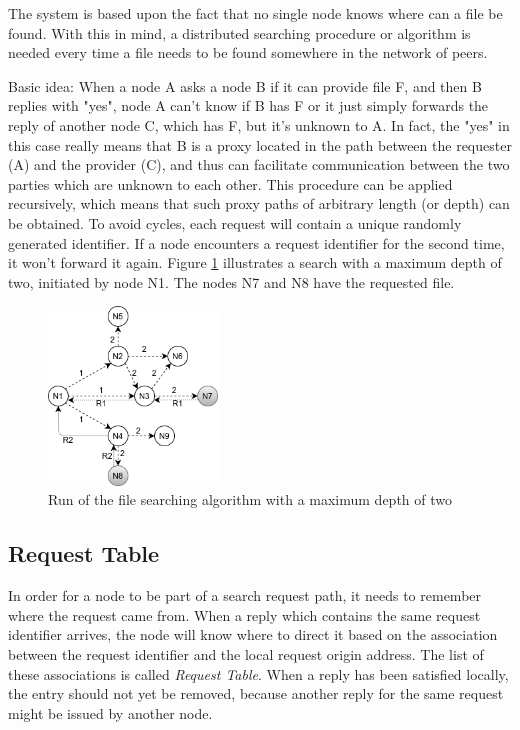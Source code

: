 The system is based upon the fact that no single node knows where can a file be 
found. With this in mind, a distributed searching procedure or algorithm is 
needed every time a file needs to be found somewhere in the network of peers.

Basic idea: When a node A asks a node B if it can provide file F, and then B 
replies with "yes", node A can't know if B has F or it just simply forwards the 
reply of another node C, which has F, but it's unknown to A. In fact, the "yes" 
in this case really means that B is a proxy located in the path between the 
requester (A) and the provider (C), and thus can facilitate communication 
between the two parties which are unknown to each other. This procedure can be 
applied recursively, which means that such proxy paths of arbitrary length (or 
depth) can be obtained. To avoid cycles, each request will contain a unique 
randomly generated identifier. If a node encounters a request identifier for 
the second time, it won't forward it again. Figure \ref{fig:fig4} illustrates a 
search with a maximum depth of two, initiated by node N1. The nodes N7 and N8 
have the requested file.

\begin{figure}
    \centering
    \includegraphics[width=0.4\textwidth]{figures/fig4}
    \caption{Run of the file searching algorithm with a maximum depth of two}
    \label{fig:fig4}
\end{figure}

\subsection{Request Table}

In order for a node to be part of a search request path, it needs to remember 
where the request came from. When a reply which contains the same request 
identifier arrives, the node will know where to direct it based on the 
association between the request identifier and the local request origin 
address. The list of these associations is called \textit{Request Table}. When 
a reply has been satisfied locally, the entry should not yet be removed, 
because another reply for the same request might be issued by another node.

